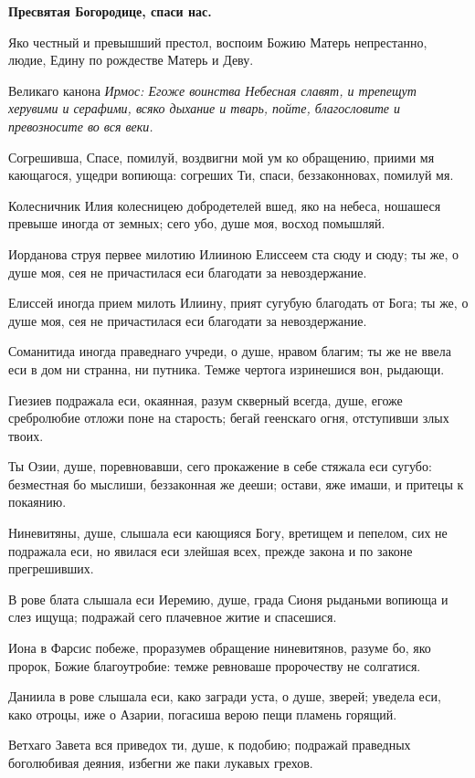 \bfseries Пресвятая Богородице, спаси нас.\normalfont{}


Яко честный и превышший престол, воспоим Божию Матерь непрестанно, людие, Едину по рождестве Матерь и Деву.


Великаго канона \itshape Ирмос\normalfont{}: Егоже воинства Небесная славят, и трепещут херувими и серафими, всяко дыхание и тварь, пойте, благословите и превозносите во вся веки.


Согрешивша, Спасе, помилуй, воздвигни мой ум ко обращению, приими мя кающагося, ущедри вопиюща: согреших Ти, спаси, беззаконновах, помилуй мя.


Колесничник Илия колесницею добродетелей вшед, яко на небеса, ношашеся превыше иногда от земных; сего убо, душе моя, восход помышляй.

Иорданова струя первее милотию Илииною Елиссеем ста сюду и сюду; ты же, о душе моя, сея не причастилася еси благодати за невоздержание.


Елиссей иногда прием милоть Илиину, прият сугубую благодать от Бога; ты же, о душе моя, сея не причастилася еси благодати за невоздержание.


Соманитида иногда праведнаго учреди, о душе, нравом благим; ты же не ввела еси в дом ни странна, ни путника. Темже чертога изринешися вон, рыдающи.


Гиезиев подражала еси, окаянная, разум скверный всегда, душе, егоже сребролюбие отложи поне на старость; бегай геенскаго огня, отступивши злых твоих.


Ты Озии, душе, поревновавши, сего прокажение в себе стяжала еси сугубо: безместная бо мыслиши, беззаконная же дееши; остави, яже имаши, и притецы к покаянию.


Ниневитяны, душе, слышала еси кающияся Богу, вретищем и пепелом, сих не подражала еси, но явилася еси злейшая всех, прежде закона и по законе прегрешивших.


В рове блата слышала еси Иеремию, душе, града Сионя рыданьми вопиюща и слез ищуща; подражай сего плачевное житие и спасешися.


Иона в Фарсис побеже, проразумев обращение ниневитянов, разуме бо, яко пророк, Божие благоутробие: темже ревноваше пророчеству не солгатися.


Даниила в рове слышала еси, како загради уста, о душе, зверей; уведела еси, како отроцы, иже о Азарии, погасиша верою пещи пламень горящий.


Ветхаго Завета вся приведох ти, душе, к подобию; подражай праведных боголюбивая деяния, избегни же паки лукавых грехов.


